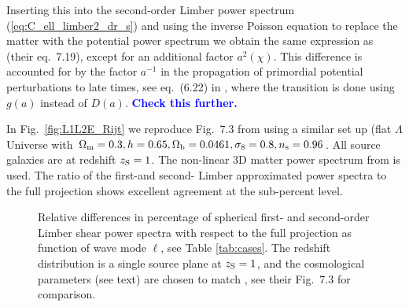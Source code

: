\documentclass[fleqn,usenatbib]{mnras} %
\newcommand{\mk}[1]{{\bf\textcolor{blue}{#1}}}
\begin{document}
\begin{appendix}
Inserting this into the second-order Limber power spectrum
(\ref{eq:C_ell_limber2_dr_s}) and using the inverse Poisson equation to replace
the matter with the potential power spectrum we obtain the same expression as
\cite{vande2012} (their eq.~7.19), except for an additional factor $a^2(\chi)$.
This difference is accounted for by the factor $a^{-1}$ in the propagation of
primordial potential perturbations to late times, see eq.~(6.22) in
\cite{vande2012}, where the transition is done using $g(a)$ instead of $D(a)$.
\mk{Check this further.}

In Fig.~\ref{fig:L1L2E_Rijt} we reproduce Fig.~7.3 from \cite{vande2012} using
a similar set up (flat $\Lambda$ Universe with $\Omega_{\rm m} = 0.3, h=0.65,
\Omega_{\rm b} = 0.0461, \sigma_8 = 0.8, n_{\rm s} = 0.96$. All source galaxies
are at redshift $z_{\rm S} = 1$. The non-linear 3D matter power spectrum from
\cite{2012ApJ...761..152T} is used. The ratio of the first-and second- Limber
approximated power spectra to the full projection shows excellent agreement at
the sub-percent level.

\begin{figure}

  \begin{center}
  \end{center}

    \caption{Relative differences in percentage of spherical first- and second-order Limber
    shear power spectra with respect to the full projection
    as function of wave mode $\ell$, see Table \ref{tab:cases}. The redshift distribution
    is a single source plane at $z_{\rm S}=1$, and the cosmological parameters (see text) are chosen to match
    \citet{vande2012}, see their Fig.~7.3 for comparison.
    }


\end{figure}
\end{appendix}
\end{document}
